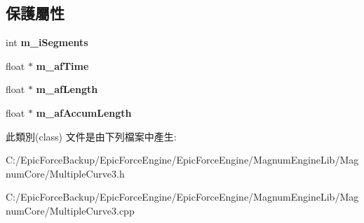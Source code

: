 \subsection*{保護屬性}
\begin{DoxyCompactItemize}
\item 
int {\bfseries m\+\_\+i\+Segments}\hypertarget{class_magnum_1_1_multiple_curve3_aecb85f71e9d75d428b03db3bdbc4ca71}{}\label{class_magnum_1_1_multiple_curve3_aecb85f71e9d75d428b03db3bdbc4ca71}

\item 
float $\ast$ {\bfseries m\+\_\+af\+Time}\hypertarget{class_magnum_1_1_multiple_curve3_a4ddcd890f05b96144b850fde16be924b}{}\label{class_magnum_1_1_multiple_curve3_a4ddcd890f05b96144b850fde16be924b}

\item 
float $\ast$ {\bfseries m\+\_\+af\+Length}\hypertarget{class_magnum_1_1_multiple_curve3_a18aa3565a6f7767b28873a31e21894f2}{}\label{class_magnum_1_1_multiple_curve3_a18aa3565a6f7767b28873a31e21894f2}

\item 
float $\ast$ {\bfseries m\+\_\+af\+Accum\+Length}\hypertarget{class_magnum_1_1_multiple_curve3_a7d0b249612e00ea9053e1b690db97a21}{}\label{class_magnum_1_1_multiple_curve3_a7d0b249612e00ea9053e1b690db97a21}

\end{DoxyCompactItemize}


此類別(class) 文件是由下列檔案中產生\+:\begin{DoxyCompactItemize}
\item 
C\+:/\+Epic\+Force\+Backup/\+Epic\+Force\+Engine/\+Epic\+Force\+Engine/\+Magnum\+Engine\+Lib/\+Magnum\+Core/Multiple\+Curve3.\+h\item 
C\+:/\+Epic\+Force\+Backup/\+Epic\+Force\+Engine/\+Epic\+Force\+Engine/\+Magnum\+Engine\+Lib/\+Magnum\+Core/Multiple\+Curve3.\+cpp\end{DoxyCompactItemize}
